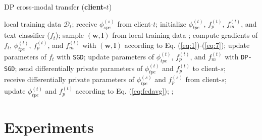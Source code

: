 \documentclass[11pt]{article}
\begin{document}
\begin{algorithm}[!htp]
\caption{DP cross-modal transfer (\textbf{client-$t$})}
\label{alg:t-side}
\small
\begin{algorithmic}[1]
    \REQUIRE local training data $\mathcal{D}_t$;
    \STATE receive ${\phi}_{spe}^{(s)}$ from client-$t$;
    \STATE  initialize ${\phi}_{tpe}^{(t)}$, ${f}_{p}^{(t)}$, ${f}_m^{(t)}$, and text classifier (${f}_t$);
            \STATE sample $(\mathbf{w}, \mathbf{l})$ from local training data ;
            \STATE compute gradients of ${f}_{t}$, ${\phi}_{tpe}^{(t)}$, ${f}_{p}^{(t)}$, and ${f}_m^{(t)}$ with $(\mathbf{w}, \mathbf{l})$ according to Eq. (\ref{eq:1})-(\ref{eq:7});
            \STATE  update parameters of ${f}_{t}$ with \texttt{SGD};
            \STATE update parameters of ${\phi}_{tpe}^{(t)}$, ${f}_{p}^{(t)}$, and ${f}_m^{(t)}$ with \texttt{DP-SGD};
        \ENDFOR
        \STATE send differentially private parameters of ${\phi}_{tpe}^{(t)}$ and ${f}_{p}^{(t)}$ to client-$s$; \\
        \STATE receive differentially private parameters of ${\phi}_{tpe}^{(s)}$ and ${f}_{p}^{(s)}$ from client-$s$; \\
        \STATE update ${\phi}_{tpe}^{(t)}$ and ${f}_{p}^{(t)}$ according to Eq. (\ref{eq:fedavg});
    \ENDWHILE
    ;
\end{algorithmic}
\end{algorithm} %








\section{Experiments}
\end{document}
